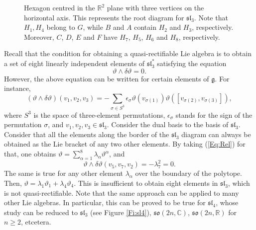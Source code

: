 \documentclass[12pt]{article}
\theoremstyle{plain}
\theoremstyle{definition}
\numberwithin{equation}{section}
\begin{document}
\begin{figure}
  \centering
  \caption{Hexagon centred in the \(\mathbb{R}^2\) plane with three vertices on the horizontal axis. This represents the root diagram for $\mathfrak{sl}_3$. Note that $H_1,H_4$ belong to $G$, while $B$ and $A$ contain $H_2$ and $H_3$, respectively. Moreover, $C$, $D$, $E$ and $F$ have $H_7$, $H_5$, $H_6$ and $H_8$, respectively. }\label{Fig:Hexagon}
\end{figure}
Recall that the condition for obtaining a quasi-rectifiable Lie algebra is to obtain a set of eight linearly independent elements of $\mathfrak{sl}_3^*$ satisfying the equation 
$$
\vartheta\wedge \delta \vartheta=0.
$$
However, the above equation can be written for certain  elements of $\mathfrak{g}$. For instance,
\begin{equation}\label{Eq:Rel}
(\vartheta \wedge \delta \vartheta) (v_1,v_2,v_3)=-\sum_{\sigma \in S^3}\epsilon_{\sigma}\vartheta(v_{\sigma(1)})\vartheta([v_{\sigma(2)},v_{\sigma(3)}]),
\end{equation}
where $S^3$ is the space of three-element permutations, $\epsilon_\sigma$ stands for the sign of the permutation $\sigma$, and  $v_1,v_2,v_3\in \mathfrak{sl}_3$. Consider the dual basis to the basis of $\mathfrak{sl}_3$. Consider that all the elements along the border of the $\mathfrak{sl}_3$ diagram can always be obtained as the Lie bracket of any two other elements. By taking (\ref{Eq:Rel}) for that, one obtains $\vartheta=\sum_{\alpha=1}^8\lambda_\alpha\vartheta^\alpha$, and 
$$
\vartheta\wedge \delta\vartheta(v_5,v_7,v_2)=-\lambda_7^2=0.
$$
The same is true for any other element $\lambda_\alpha$ over the boundary of the polytope.
 Then, $\vartheta=\lambda_1\vartheta_1+\lambda_4\vartheta_4$. This is insufficient to obtain eight elements in $\mathfrak{sl}_3$, which is not quasi-rectifiable. Note that the same approach can be applied to many other Lie algebras. In particular, this can be proved to be true for $\mathfrak{sl}_4$, whose study can be reduced to $\mathfrak{sl}_3$ (see Figure \ref{Fi:sl4}), $\mathfrak{so}(2n,\mathbb{C})$, $\mathfrak{so}(2n,\mathbb{R})$ for $n\geq 2$, etcetera.
\end{document}
